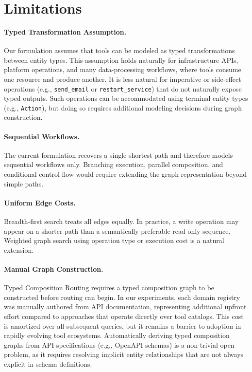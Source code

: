 \section{Limitations}
\label{sec:limitations}

\paragraph{Typed Transformation Assumption.}

Our formulation assumes that tools can be modeled as typed transformations between entity types.
This assumption holds naturally for infrastructure APIs, platform operations, and many data-processing workflows, where tools consume one resource and produce another.
It is less natural for imperative or side-effect operations (e.g., \texttt{send\_email} or \texttt{restart\_service}) that do not naturally expose typed outputs.
Such operations can be accommodated using terminal entity types (e.g., \texttt{Action}), but doing so requires additional modeling decisions during graph construction.

\paragraph{Sequential Workflows.}

The current formulation recovers a single shortest path and therefore models sequential workflows only.
Branching execution, parallel composition, and conditional control flow would require extending the graph representation beyond simple paths.

\paragraph{Uniform Edge Costs.}

Breadth-first search treats all edges equally.
In practice, a write operation may appear on a shorter path than a semantically preferable read-only sequence.
Weighted graph search using operation type or execution cost is a natural extension.

\paragraph{Manual Graph Construction.}

Typed Composition Routing requires a typed composition graph to be constructed before routing can begin.
In our experiments, each domain registry was manually authored from API documentation, representing additional upfront effort compared to approaches that operate directly over tool catalogs.
This cost is amortized over all subsequent queries, but it remains a barrier to adoption in rapidly evolving tool ecosystems.
Automatically deriving typed composition graphs from API specifications (e.g., OpenAPI schemas) is a non-trivial open problem, as it requires resolving implicit entity relationships that are not always explicit in schema definitions.

